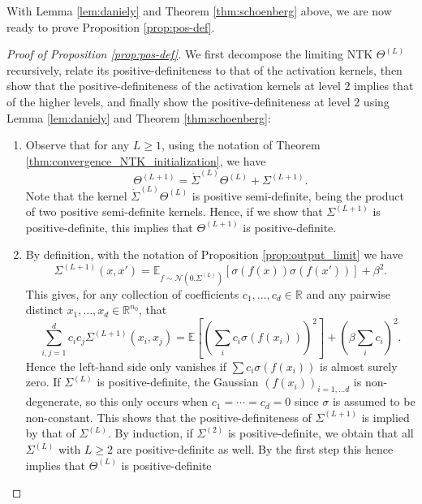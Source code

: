 \documentclass{article}
\begin{document}
With Lemma \ref{lem:daniely} and Theorem \ref{thm:schoenberg} above,
we are now ready to prove Proposition \ref{prop:pos-def}.
\begin{proof}[Proof of Proposition \ref{prop:pos-def}]
We first decompose the limiting NTK $\Theta^{\left(L\right)}$ recursively,
relate its positive-definiteness to that of the activation kernels,
then show that the positive-definiteness of the activation kernels
at level $2$ implies that of the higher levels, and finally show the
positive-definiteness at level $2$ using Lemma \ref{lem:daniely}
and Theorem \ref{thm:schoenberg}:
\begin{enumerate}
\item Observe that for any $L\geq1$, using the notation of Theorem \ref{thm:convergence_NTK_initialization}, we have
\[
\Theta^{\left(L+1\right)}=\dot{\Sigma}^{\left(L\right)}\Theta^{\left(L\right)}+\Sigma^{\left(L+1\right)}.
\]
Note that the kernel $ \dot{\Sigma}^{\left(L\right)}\Theta^{\left(L\right)} $ is positive semi-definite, being the product of two positive semi-definite kernels.
Hence, if we show that $\Sigma^{\left(L+1\right)}$ is positive-definite,
this implies that $\Theta^{\left(L+1\right)}$ is positive-definite.
\item By definition, with the notation of Proposition \ref{prop:output_limit}
we have 
\[
\Sigma^{\left(L+1\right)}\left(x,x'\right)=\mathbb{E}_{f\sim\mathcal{N}\left(\text{0,}\Sigma^{\left(L\right)}\right)}\left[\sigma\left(f\left(x\right)\right)\sigma\left(f\left(x'\right)\right)\right]+\beta^{2}.
\]
This gives, for any collection of coefficients $c_{1},\ldots,c_{d}\in\mathbb{R}$
and any pairwise distinct $x_{1},\ldots,x_{d}\in\mathbb{R}^{n_{0}}$, that
\[
\sum_{i,j=1}^{d}c_{i}c_{j}\Sigma^{\left(L+1\right)}\left(x_{i},x_{j}\right)=\mathbb{E}\left[\left(\sum_{i}c_{i}\sigma\left(f\left(x_{i}\right)\right)\right)^{2}\right]+\left(\beta\sum_{i}c_{i}\right)^{2}.
\]
Hence the left-hand side only vanishes if $\sum c_{i}\sigma\left(f\left(x_{i}\right)\right)$
is almost surely zero. If $\Sigma^{\left(L\right)}$ is positive-definite,
the Gaussian $\left(f\left(x_{i}\right)\right)_{i=1,\ldots d}$ is
non-degenerate, so this only occurs when $c_{1}=\cdots=c_{d}=0$ since
$\sigma$ is assumed to be non-constant. This shows that the positive-definiteness
of $\Sigma^{\left(L+1\right)}$ is implied by that of $\Sigma^{\left(L\right)}$.
By induction, if $\Sigma^{\left(2\right)}$ is positive-definite,
we obtain that all $\Sigma^{\left(L\right)}$ with $L\geq2$ are positive-definite
as well. By the first step this hence implies that $\Theta^{\left(L\right)}$ is positive-definite

\end{enumerate}
\end{proof}
\end{document}
